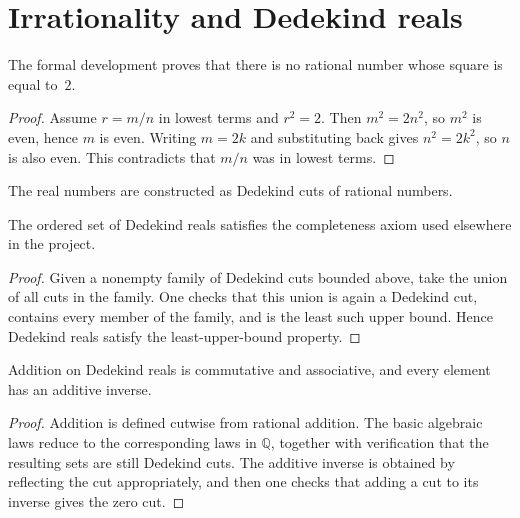 \section{Irrationality and Dedekind reals}

\begin{theorem}
\label{thm:sqrt-two-irrational}
The formal development proves that there is no rational number whose square is equal to~$2$.
\begin{proof}
Assume $r=m/n$ in lowest terms and $r^2=2$. Then $m^2=2n^2$, so $m^2$ is even, hence $m$ is
even. Writing $m=2k$ and substituting back gives $n^2=2k^2$, so $n$ is also even. This
contradicts that $m/n$ was in lowest terms.
\end{proof}
\end{theorem}

\begin{definition}
\label{def:dedekind-real}
The real numbers are constructed as Dedekind cuts of rational numbers.
\end{definition}

\begin{theorem}
\label{thm:dedekind-complete}
The ordered set of Dedekind reals satisfies the completeness axiom used elsewhere in the
project.
\begin{proof}
Given a nonempty family of Dedekind cuts bounded above, take the union of all cuts in the
family. One checks that this union is again a Dedekind cut, contains every member of the
family, and is the least such upper bound. Hence Dedekind reals satisfy the least-upper-bound
property.
\end{proof}
\end{theorem}

\begin{theorem}
\label{thm:dedekind-additive-structure}
Addition on Dedekind reals is commutative and associative, and every element has an
additive inverse.
\begin{proof}
Addition is defined cutwise from rational addition. The basic algebraic laws reduce to the
corresponding laws in $\mathbb{Q}$, together with verification that the resulting sets are still
Dedekind cuts. The additive inverse is obtained by reflecting the cut appropriately, and then
one checks that adding a cut to its inverse gives the zero cut.
\end{proof}
\end{theorem}

